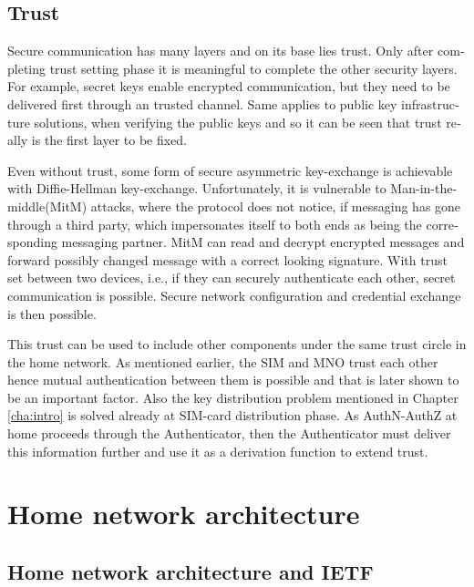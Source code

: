 \documentclass[12pt,a4paper,english]{tutthesis}
\begin{document}
\begin{otherlanguage}{english}
\section{Trust}
\label{sec-2-7}

Secure communication has many layers and on its base lies trust. 
Only after completing trust setting phase it is meaningful to complete
the other security layers. For example, secret keys enable encrypted
communication, but they need to be delivered first through an trusted
channel. Same applies to public key infrastructure solutions, when
verifying the public keys and so it can be seen that trust
really is the first layer to be fixed.



Even without trust, some form of secure asymmetric key-exchange is achievable
with Diffie-Hellman key-exchange\cite{diffie1976new}. Unfortunately, it is vulnerable
to Man-in-the-middle(MitM) attacks, where the protocol does not notice, 
if messaging has gone through a third party, which impersonates itself to 
both ends as being the corresponding messaging partner. MitM can
read and decrypt encrypted messages and forward possibly changed message with
a correct looking signature.
With trust set between two devices, i.e.,  if they can securely
authenticate each other, secret communication is possible. 
Secure network configuration and credential exchange is then possible.


This trust can be used to include other components under the
same trust circle in the home network. As mentioned earlier, the SIM
and MNO trust each other hence mutual authentication between them is
possible and that is later shown to be an important factor.  Also the
key distribution problem mentioned in Chapter \ref{cha:intro} is solved
already at SIM-card distribution phase.  As AuthN-AuthZ at home
proceeds through the Authenticator, then the Authenticator must
deliver this information further and use it as a derivation function
to extend trust.




\chapter{Home network architecture}
\label{sec-3}

\section{Home network architecture and IETF}
\label{sec-3-1}



\end{otherlanguage}
\end{document}
